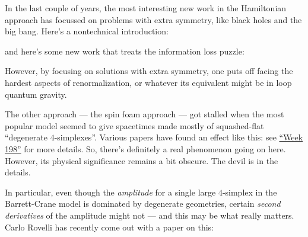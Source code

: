 \documentclass{article}
\def\tightlist{}
\renewcommand{\texttt}[1]{%
  \begingroup
  \ttfamily
  \begingroup\lccode`~=`/\lowercase{\endgroup\def~}{/\discretionary{}{}{}}%
  \begingroup\lccode`~=`[\lowercase{\endgroup\def~}{[\discretionary{}{}{}}%
  \begingroup\lccode`~=`.\lowercase{\endgroup\def~}{.\discretionary{}{}{}}%
  \catcode`/=\active\catcode`[=\active\catcode`.=\active
  \scantokens{#1\noexpand}%
  \endgroup
}
\begin{document}
In the last couple of years, the most interesting new work in the
Hamiltonian approach has focussed on problems with extra symmetry, like
black holes and the big bang. Here's a nontechnical introduction:


and here's some new work that treats the information loss puzzle:


However, by focusing on solutions with extra symmetry, one puts off
facing the hardest aspects of renormalization, or whatever its
equivalent might be in loop quantum gravity.

The other approach --- the spin foam approach --- got stalled when the
most popular model seemed to give spacetimes made mostly of
squashed-flat ``degenerate \(4\)-simplexes''. Various papers have found
an effect like this: see \protect\hyperlink{week198}{``Week 198''} for
more details. So, there's definitely a real phenomenon going on here.
However, its physical significance remains a bit obscure. The devil is
in the details.

In particular, even though the \emph{amplitude} for a single large
\(4\)-simplex in the Barrett-Crane model is dominated by degenerate
geometries, certain \emph{second derivatives} of the amplitude might not
--- and this may be what really matters. Carlo Rovelli has recently come
out with a paper on this:

\end{document}
